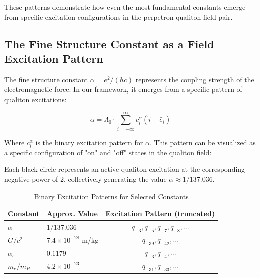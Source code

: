 \documentclass{article}
\begin{document}
These patterns demonstrate how even the most fundamental constants emerge from specific excitation configurations in the perpetron-qualiton field pair.

\subsection{The Fine Structure Constant as a Field Excitation Pattern}

The fine structure constant $\alpha = e^2/(\hbar c)$ represents the coupling strength of the electromagnetic force. In our framework, it emerges from a specific pattern of qualiton excitations:

\begin{equation}
\alpha = \Lambda_0 \cdot \sum_{i=-\infty}^{\infty} c_i^\alpha (\hat{i} + \hat{e}_i)
\end{equation}

Where $c_i^\alpha$ is the binary excitation pattern for $\alpha$. This pattern can be visualized as a specific configuration of "on" and "off" states in the qualiton field:

\begin{figure}[h]
\centering
{}
\end{figure}

Each black circle represents an active qualiton excitation at the corresponding negative power of 2, collectively generating the value $\alpha \approx 1/137.036$.

\begin{table}[h]
\centering
\caption{Binary Excitation Patterns for Selected Constants}
\begin{tabular}{@{}llc@{}}
\toprule
Constant & Approx. Value & Excitation Pattern (truncated) \\
\midrule
$\alpha$ & $1/137.036$ & $q_{-3}, q_{-5}, q_{-7}, q_{-8}, \ldots$ \\
$G/c^2$ & $7.4 \times 10^{-28}$ m/kg & $q_{-39}, q_{-42}, \ldots$ \\
$\alpha_s$ & $0.1179$ & $q_{-3}, q_{-4}, \ldots$ \\
$m_e/m_P$ & $4.2 \times 10^{-23}$ & $q_{-31}, q_{-33}, \ldots$ \\
\bottomrule
\end{tabular}
\end{table}
\end{document}
